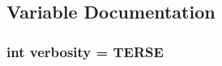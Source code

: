 \subsection{Variable Documentation}
\hypertarget{buddy-test_8c_a1bdcfae3209cbd96db35a2ae356fa15e}{
\subsubsection[{verbosity}]{\setlength{\rightskip}{0pt plus 5cm}int {\bf verbosity} = TERSE}}
\label{buddy-test_8c_a1bdcfae3209cbd96db35a2ae356fa15e}
